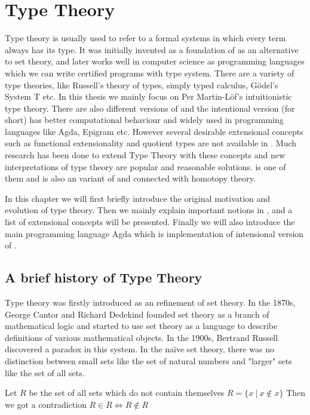 \chapter{Type Theory}
\label{bg}

Type theory is usually used to refer to a formal systems in which every term always has its type. It was initially invented as a foundation of \maths as an alternative to set theory, and later works well in computer science as programming languages which we can write certified programs with type system. There are a variety of type theories, like Russell's theory of types, simply typed calculus, Gödel's System T \cite{gdl:1931} etc. In this thesis we mainly focus on Per Martin-L\"{o}f's intuitionistic type theory. There are also different versions of \mltt and the intentional version (\itt for short) has better computational behaviour and widely used in programming languages like Agda, Epigram etc. However several desirable extensional concepts such as functional extensionality and quotient types are not available in \itt. Much research has been done to extend Type Theory with these concepts and new interpretations of type theory are popular and reasonable solutions. \hott is one of them and is also an variant of \mltt and connected with homotopy theory. 


In this chapter we will first briefly introduce the original motivation and evolution of type theory. Then we mainly explain important notions in \mltt, and a list of extensional concepts will be presented. Finally we will also introduce the main programming language Agda which is implementation of intensional version of \mltt.


\section{A brief history of Type Theory}

Type theory was firstly introduced as an refinement of set theory. 
In the 1870s, George Cantor and Richard Dedekind founded set theory as a branch of mathematical logic and started to use set theory as a language to describe definitions of various mathematical objects.
In the 1900s, Bertrand Russell discovered a paradox in this system. In the naïve set theory, there was no distinction between small sets like the set of natural numbers and "larger" sets like the set of all sets.

\begin{example}
Let $R$ be the set of all sets which do not contain themselves
$R = \{x ~| ~x \not\in  x\}$
Then we got a contradiction
$R \in R \iff R \not\in R$
\end{example}

